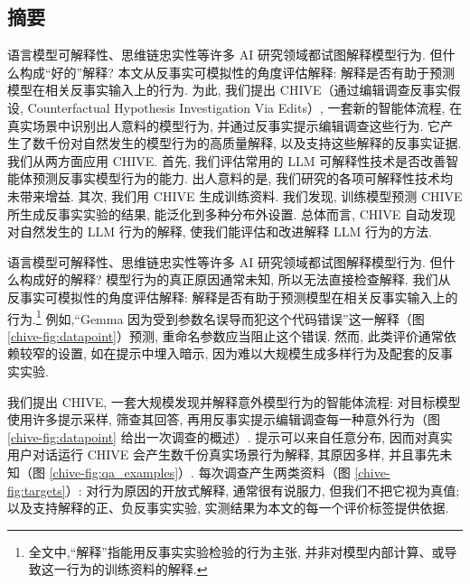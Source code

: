 \subsection*{摘要}\label{chive-abstract}
语言模型可解释性、思维链忠实性等许多 AI 研究领域都试图解释模型行为. 但什么构成“好的”解释? 本文从反事实可模拟性的角度评估解释: 解释是否有助于预测模型在相关反事实输入上的行为. 为此, 我们提出 CHIVE（通过编辑调查反事实假设, Counterfactual Hypothesis Investigation Via Edits）, 一套新的智能体流程, 在真实场景中识别出人意料的模型行为, 并通过反事实提示编辑调查这些行为. 它产生了数千份对自然发生的模型行为的高质量解释, 以及支持这些解释的反事实证据. 我们从两方面应用 CHIVE. 首先, 我们评估常用的 LLM 可解释性技术是否改善智能体预测反事实模型行为的能力. 出人意料的是, 我们研究的各项可解释性技术均未带来增益. 其次, 我们用 CHIVE 生成训练资料. 我们发现, 训练模型预测 CHIVE 所生成反事实实验的结果, 能泛化到多种分布外设置. 总体而言, CHIVE 自动发现对自然发生的 LLM 行为的解释, 使我们能评估和改进解释 LLM 行为的方法.

语言模型可解释性、思维链忠实性等许多 AI 研究领域都试图解释模型行为. 但什么构成好的解释? 模型行为的真正原因通常未知, 所以无法直接检查解释. 我们从反事实可模拟性\cite{chive-chen2023modelsexplainthemselvescounterfactual}的角度评估解释: 解释是否有助于预测模型在相关反事实输入上的行为.\footnote{全文中,“解释”指能用反事实实验检验的行为主张, 并非对模型内部计算、或导致这一行为的训练资料的解释.} 例如,“Gemma 因为受到参数名误导而犯这个代码错误”这一解释（图 \ref{chive-fig:datapoint}）预测, 重命名参数应当阻止这个错误. 然而, 此类评价通常依赖较窄的设置, 如在提示中埋入暗示\cite{chive-hase2026counterfactualsimulationtrainingchainofthought}, 因为难以大规模生成多样行为及配套的反事实实验.

我们提出 CHIVE, 一套大规模发现并解释意外模型行为的智能体流程: 对目标模型使用许多提示采样, 筛查其回答, 再用反事实提示编辑调查每一种意外行为（图 \ref{chive-fig:datapoint} 给出一次调查的概述）. 提示可以来自任意分布, 因而对真实用户对话运行 CHIVE 会产生数千份真实场景行为解释, 其原因多样, 并且事先未知（图 \ref{chive-fig:qa_examples}）. 每次调查产生两类资料（图 \ref{chive-fig:targets}）: 对行为原因的开放式解释, 通常很有说服力, 但我们不把它视为真值; 以及支持解释的正、负反事实实验, 实测结果为本文的每一个评价标签提供依据.

